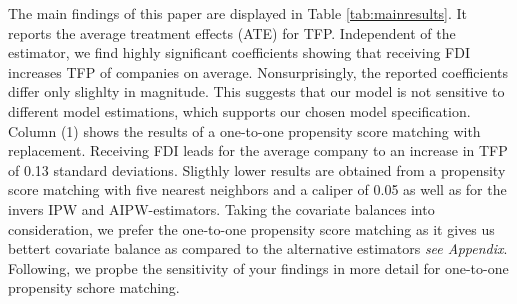 \documentclass[a4paper,11pt]{scrartcl}
\begin{document}
The main findings of this paper are displayed in Table \ref{tab:mainresults}. It reports the average treatment effects (ATE) for TFP.  Independent of the estimator, we find highly significant coefficients showing that receiving FDI increases TFP of companies on average. Nonsurprisingly, the reported coefficients differ only slighlty in magnitude. This suggests that our model is not sensitive to different model estimations, which supports our chosen model specification.  Column (1) shows the results of a one-to-one propensity score matching with replacement. Receiving FDI leads for the average company to an increase in TFP of 0.13 standard deviations. Sligthly lower results are obtained from a propensity score matching with five nearest neighbors and a caliper of 0.05 as well as for the invers IPW and AIPW-estimators.
Taking the covariate balances into consideration, we prefer the one-to-one propensity score matching as it gives us bettert covariate balance as compared to the alternative estimators \textit{see Appendix}. Following, we propbe the sensitivity of your findings in  more detail for one-to-one propensity schore matching. 

\end{document}
